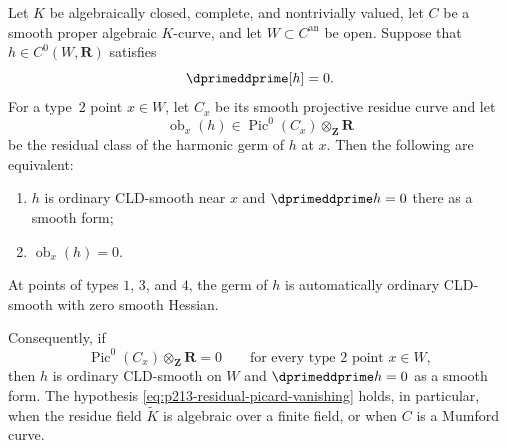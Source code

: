 
\begin{proposition}
\label{prop:p213-residual-picard-smooth-curve}
Let $K$ be algebraically closed, complete, and nontrivially valued, let
$C$ be a smooth proper algebraic $K$-curve, and let
$W\subset C^{\mathrm{an}}$ be open.  Suppose that
$h\in C^0(W,\mathbf R)$ satisfies
\[
                         \dprimeddprime[h]=0.
\]
For a type~$2$ point $x\in W$, let $C_x$ be its smooth projective
residue curve and let
\[
 \operatorname{ob}_x(h)\in
 \operatorname{Pic}^0(C_x)\otimes_{\mathbf Z}\mathbf R
\]
be the residual class of the harmonic germ of $h$ at $x$.  Then the
following are equivalent:
\begin{enumerate}
\item $h$ is ordinary CLD-smooth near $x$ and
      $\dprimeddprime h=0$ there as a smooth form;
\item $\operatorname{ob}_x(h)=0$.
\end{enumerate}
At points of types $1$, $3$, and $4$, the germ of $h$ is automatically
ordinary CLD-smooth with zero smooth Hessian.

Consequently, if
\begin{equation}
\label{eq:p213-residual-picard-vanishing}
       \operatorname{Pic}^0(C_x)\otimes_{\mathbf Z}\mathbf R=0
       \qquad\text{for every type~$2$ point }x\in W,
\end{equation}
then $h$ is ordinary CLD-smooth on $W$ and
$\dprimeddprime h=0$ as a smooth form.  The hypothesis
\eqref{eq:p213-residual-picard-vanishing} holds, in particular, when the
residue field $\widetilde K$ is algebraic over a finite field, or when
$C$ is a Mumford curve.
\end{proposition}

